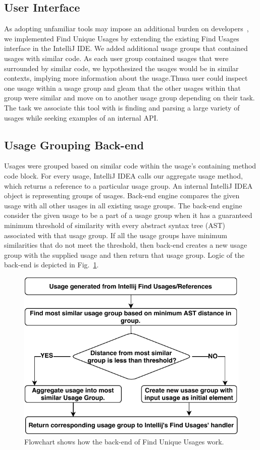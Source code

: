 \documentclass[conference]{IEEEtran}
\begin{document}
\subsection{User Interface} 
As adopting unfamiliar tools may impose an additional burden on developers~\cite{adaption2002}, we implemented Find Unique Usages by extending the existing Find Usages interface in the IntelliJ IDE. We added additional usage groups that contained usages with similar code. As each user group contained usages that were surrounded by similar code, we hypothesized the usages would be in similar contexts, implying more information about the usage.Thusa user could inspect one usage within a usage group and gleam that the other usages within that group were similar and move on to another usage group depending on their task. The task we associate this tool with is finding and parsing a large variety of usages while seeking examples of an internal API.

\subsection{Usage Grouping Back-end} 
Usages were grouped based on similar code within the usage's containing method code block. For every usage, IntelliJ IDEA calls our aggregate usage method, which returns a reference to a particular usage group. An internal IntelliJ IDEA object is representing groups of usages. Back-end engine compares the given usage with all other usages in all existing usage groups. The back-end engine consider the given usage to be a part of a usage group when it has a guaranteed minimum threshold of similarity with every abstract syntax tree (AST)  associated with that usage group. If all the usage groups have minimum similarities that do not meet the threshold, then back-end creates a new usage group with the supplied usage and then return that usage group. Logic of the back-end is depicted in Fig.~\ref{fig:flowchart}. \par
\begin{figure}
    \centering
    \includegraphics [width=\columnwidth,keepaspectratio, clip]{figures/flowchart}
    \caption{Flowchart shows how the back-end of Find Unique Usages work. }
\label{fig:flowchart}
\end{figure}
\end{document}
